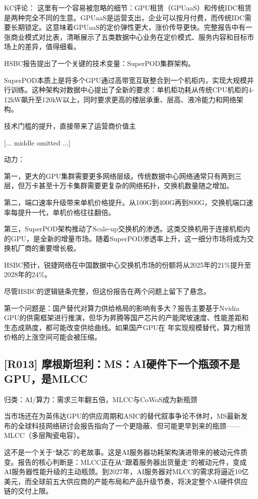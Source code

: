 \documentclass[11pt]{ctexart}
\begin{document}
KC评论： 这里有一个容易被忽略的细节：GPU租赁（GPUaaS）和传统IDC租赁是两种完全不同的生意。GPUaaS是运营支出，企业可以按月付费，而传统IDC需要长期锁定。这意味着GPUaaS的定价弹性更大，涨价传导更快。完整报告中有一张商业模式对比表，清晰展示了五类数据中心业务在定价模式、服务内容和目标市场上的差异，值得细看。

HSBC报告提出了一个关键的技术变量：SuperPOD集群架构。

SuperPOD本质上是将多个GPU通过高带宽互联整合到一个机柜内，实现大规模并行训练。这种架构对数据中心提出了全新的要求：单机柜功耗从传统CPU机柜的4-12kW飙升至120kW以上，同时要求更高的楼层承重、层高、液冷能力和网络架构。

技术门槛的提升，直接带来了运营商价值主

[... middle omitted ...]

动力：

第一，更大的GPU集群需要更多网络层级。传统数据中心网络通常只有两到三层，但万卡甚至十万卡集群需要更复杂的网络拓扑，交换机数量随之增加。

第二，端口速率升级带来单机价格提升。从100G到400G再到800G，交换机端口速率每提升一代，单机价格往往翻倍。

第三，SuperPOD架构推动了Scale-up交换机的渗透。这类交换机用于连接机柜内的GPU，是全新的增量市场。随着SuperPOD渗透率上升，这一细分市场将成为交换机厂商的重要增长极。

HSBC预计，锐捷网络在中国数据中心交换机市场的份额将从2025年的21\%提升至2028年的24\%。

尽管HSBC的逻辑链条完整，但这份报告在两个问题上留下了悬念。

第一个问题是：国产替代对算力供给格局的影响有多大？报告主要基于Nvidia GPU的供需框架进行推演，但华为昇腾等国产芯片的产能爬坡速度、性能差距和生态成熟度，都可能改变供给曲线。如果国产GPU在 年实现规模替代，算力租赁价格的上涨空间可能会被压缩。

\subsection{[R013] 摩根斯坦利：MS：AI硬件下一个瓶颈不是GPU，是MLCC}
{\small\color{refgray}归类：AI/算力：需求三年翻五倍，MLCC与CoWoS成为新瓶颈}

当市场还在为英伟达GPU的供应周期和ASIC的替代叙事争论不休时，MS最新发布的全球科技网络研讨会报告指向了一个更隐蔽、但可能更早到来的瓶颈——MLCC（多层陶瓷电容）。

这不是一个关于“缺芯”的老故事。这是AI服务器功耗架构演进带来的被动元件质变。报告的核心判断是：MLCC正在从“跟着服务器出货量走”的被动元件，变成AI服务器性能升级的主动瓶颈。到2027年，AI服务器对MLCC的需求将逼近10亿美元，而全球前五大供应商的产能布局和产品升级节奏，将决定整个AI硬件供应链的交付上限。
\end{document}
